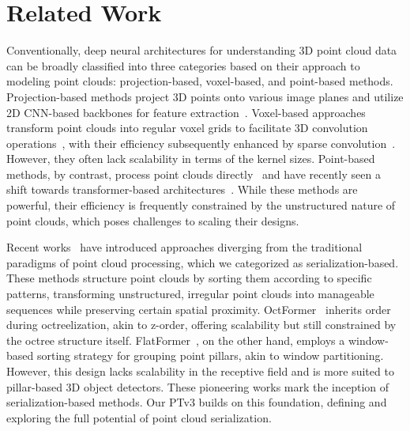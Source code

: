 \section{Related Work}
\label{sec:related}

Conventionally, deep neural architectures for understanding 3D point cloud data can be broadly classified into three categories based on their approach to modeling point clouds: projection-based, voxel-based, and point-based methods. Projection-based methods project 3D points onto various image planes and utilize 2D CNN-based backbones for feature extraction~\cite{su15mvcnn,li2016vehicle,chen2017multi,lang2019pointpillars}. Voxel-based approaches transform point clouds into regular voxel grids to facilitate 3D convolution operations~\cite{maturana2015voxnet,song2017semantic}, with their efficiency subsequently enhanced by sparse convolution~\cite{wang2017ocnn,graham20183d,choy20194d}. 
However, they often lack scalability in terms of the kernel sizes. Point-based methods, by contrast, process point clouds directly~\cite{qi2017pointnet,qi2017pointnet++,zhao2019pointweb,thomas2019kpconv, ma2022rethinking} and have recently seen a shift towards transformer-based architectures~\cite{guo2021pct,zhao2021point,wu2022point, robert2023spt, yang2023swin3d}.
While these methods are powerful, their efficiency is frequently constrained by the unstructured nature of point clouds, which poses challenges to scaling their designs.

Recent works~\cite{Wang2023OctFormer, liu2023flatformer, chen2022efficient} have introduced approaches diverging from the traditional paradigms of point cloud processing, which we categorized as serialization-based. These methods structure point clouds by sorting them according to specific patterns, transforming unstructured, irregular point clouds into manageable sequences while preserving certain spatial proximity. OctFormer~\cite{Wang2023OctFormer} inherits order during octreelization, akin to z-order, offering scalability but still constrained by the octree structure itself. FlatFormer~\cite{liu2023flatformer}, on the other hand, employs a window-based sorting strategy for grouping point pillars, akin to window partitioning. However, this design lacks scalability in the receptive field and is more suited to pillar-based 3D object detectors. These pioneering works mark the inception of serialization-based methods. Our PTv3 builds on this foundation, defining and exploring the full potential of point cloud serialization.

